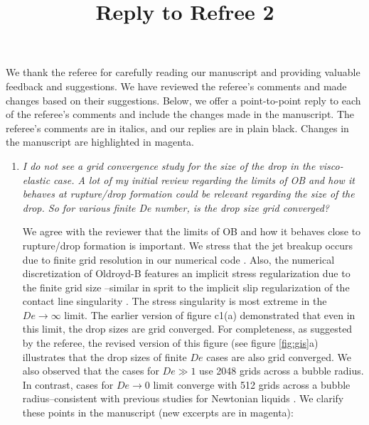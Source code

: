 \documentclass[]{article}
\title{\textbf{Reply to Refree 2}}
\date{\vspace{-5ex}}
\begin{document}
\maketitle %
We thank the referee for carefully reading our manuscript and providing valuable feedback and suggestions. We have reviewed the referee’s comments and made changes based on their suggestions. Below, we offer a point-to-point reply to each of the referee’s comments and include the changes made in the manuscript. The referee’s comments are in italics, and our replies are in plain black. Changes in the manuscript are highlighted in magenta.

\begin{enumerate}
    \item \textit{I do not see a grid convergence study for the size of the drop in the visco-elastic case. A lot of my initial review regarding the limits of OB and how it behaves at rupture/drop formation could be relevant regarding the size of the drop. So for various finite De number, is the drop size grid converged?}

        We agree with the reviewer that the limits of OB and how it behaves close to rupture/drop formation is important. We stress that the jet breakup occurs due to finite grid resolution in our numerical code \citep{lohse-2020-pnas,chirco2022manifold,kant2023bag}. Also, the numerical discretization of Oldroyd-B features an implicit stress regularization due to the finite grid size \citep{renardy2021mathematician}--similar in sprit to the implicit slip regularization of the contact line singularity \citep{afkhamiTransitionNumericalModel2018,fullanaConsistentTreatmentDynamic2024}. 
        The stress singularity is most extreme in the $De \to \infty$ limit. The earlier version of figure c1(a) demonstrated that even in this limit, the drop sizes are grid converged. For completeness, as suggested by the referee, the revised version of this figure (see figure \ref{fig:gis}a) illustrates that the drop sizes of finite $De$ cases are also grid converged. We also observed that the cases for $De \gg 1$ use 2048 grids across a bubble radius. In contrast, cases for $De \to 0$ limit converge with 512 grids across a bubble radius--consistent with previous studies for Newtonian liquids \citep{deike2018dynamics}. We clarify these points in the manuscript (new excerpts are in magenta): 
		

\end{enumerate}
\end{document}
